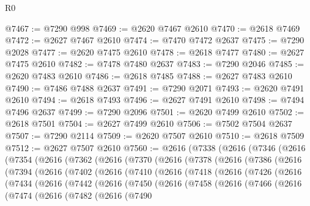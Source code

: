 \begin{lexlean}{R0}
\begin{coremodule}
@7467 := @7290 @998
@7469 := @2620 @7467 @2610
@7470 := @2618 @7469
@7472 := @2627 @7467 @2610
@7474 := @7470 @7472 @2637
@7475 := @7290 @2028
@7477 := @2620 @7475 @2610
@7478 := @2618 @7477
@7480 := @2627 @7475 @2610
@7482 := @7478 @7480 @2637
@7483 := @7290 @2046
@7485 := @2620 @7483 @2610
@7486 := @2618 @7485
@7488 := @2627 @7483 @2610
@7490 := @7486 @7488 @2637
@7491 := @7290 @2071
@7493 := @2620 @7491 @2610
@7494 := @2618 @7493
@7496 := @2627 @7491 @2610
@7498 := @7494 @7496 @2637
@7499 := @7290 @2096
@7501 := @2620 @7499 @2610
@7502 := @2618 @7501
@7504 := @2627 @7499 @2610
@7506 := @7502 @7504 @2637
@7507 := @7290 @2114
@7509 := @2620 @7507 @2610
@7510 := @2618 @7509
@7512 := @2627 @7507 @2610
@7560 := @2616
    (@7338
      (@2616
        (@7346
          (@2616
            (@7354
              (@2616
                (@7362
                  (@2616
                    (@7370
                      (@2616
                        (@7378
                          (@2616
                            (@7386
                              (@2616
                                (@7394
                                  (@2616
                                    (@7402
                                      (@2616
                                        (@7410
                                          (@2616
                                            (@7418
                                              (@2616
                                                (@7426
                                                  (@2616
                                                    (@7434
                                                      (@2616
                                                        (@7442
                                                          (@2616
                                                            (@7450
                                                              (@2616
                                                                (@7458
                                                                  (@2616
                                                                    (@7466
                                                                      (@2616
                                                                        (@7474
                                                                          (@2616
                                                                            (@7482
                                                                              (@2616
                                                                                (@7490

\end{coremodule}
\end{lexlean}
